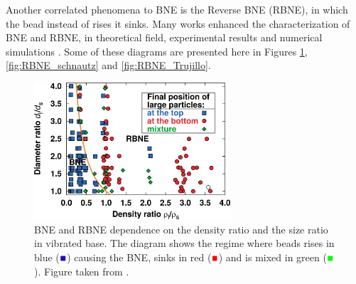     Another correlated phenomena to BNE is the Reverse BNE (RBNE), in which the bead instead of rises it sinks. Many works enhanced the characterization of BNE and RBNE, in theoretical field, experimental results and numerical simulations \cite{A_Horizontal_Brazil-Nut_Effect_and_Its_Reverse, Brazil-nut_effect_versus_reverse_Brazil-nut_effect_in_a_moderately_dense_granular_fluid, Caracterization_of_Brazil_nut_and_its_reverse_under_less-convective_conditions_for_microgravity_geology, Competition_of_Brazil_nut_effect_buoyancy_and_inelasticity_induced_segregation_in_a_granular_mixture, Reverse_Brazil_Nut_Problem_Competition_between_Percolation_and_Condensation, Reverse_buoyancy_in_a_vibrated_granular_bed_Computer_Simulations, Reversing_the_Brazil-Nut_Effect_Competition_between_Percolation_and_Condensation, Segregation_in_a_fluidized_binary_granular_mixture_Competition_between_buoyancy_and_geometric_forces, Simple_model_for_reverse_buoyancy_in_a_vibrated_granular_system, Hydrodynamic_theory_for_reverse_brazil_nut_segregation_and_the_non-monotonic_ascension_dynamics}. Some of these diagrams are presented here in Figures \ref{fig:RBNE_breu}, \ref{fig:RBNE_schnautz} and \ref{fig:RBNE_Trujillo}.

\begin{figure}
    \centering
    \includegraphics[width=0.65\textwidth]{04-figuras/BNE_Breu.png}
    \caption[Phase diagram of BNE/RBNE from experiment: density ratio and size ratio.]{BNE and RBNE dependence on the density ratio and the size ratio in vibrated base. The diagram shows the regime where beads rises in blue ($\textcolor{blue}{\blacksquare}$) causing the BNE, sinks in red ($\textcolor{red}{\blacksquare}$) and is mixed in green ($\textcolor{green}{\blacksquare}$). Figure taken from \cite{Reversing_the_Brazil-Nut_Effect_Competition_between_Percolation_and_Condensation}.}
    \label{fig:RBNE_breu}
\end{figure}

